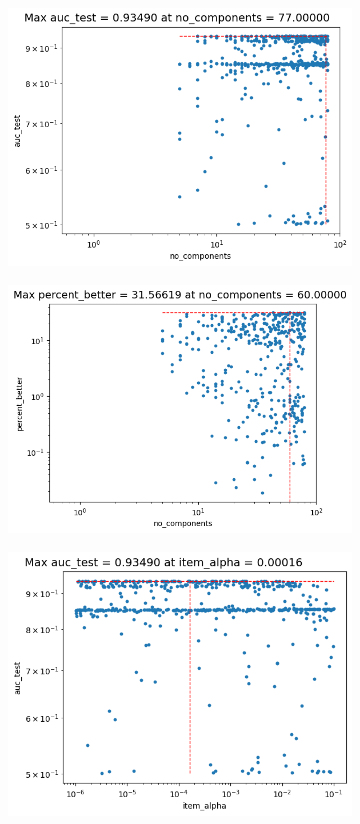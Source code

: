 \documentclass[10pt,a4paper]{article}
\begin{document}
\begin{figure}[H]
\begin{subfigure}{.5\textwidth}
    \includegraphics[width=1\linewidth]{image_2024-01-19_195516476.png}
\end{subfigure}%
\begin{subfigure}{.5\textwidth}
    \centering
    \includegraphics[width=1\linewidth]{image_2024-01-19_235314759.png}
\end{subfigure}
\begin{subfigure}{.5\textwidth}
    \centering
    \includegraphics[width=1\linewidth]{image_2024-01-19_195441467.png}

\end{subfigure}
\end{figure}
\end{document}
